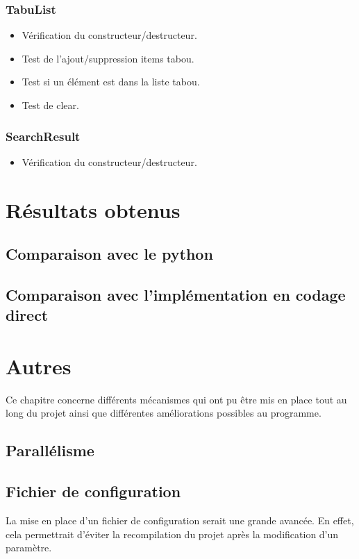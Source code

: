 \documentclass[hideweeklyreports]{polytech/polytech}
\begin{document}
			\subsection{TabuList}
				\begin{itemize}
					\item Vérification du constructeur/destructeur.
					\item Test de l'ajout/suppression items tabou.
					\item Test si un élément est dans la liste tabou.
					\item Test de clear.
				\end{itemize}
				
			\subsection{SearchResult}
				\begin{itemize}
					\item Vérification du constructeur/destructeur.
				\end{itemize}
		
	\chapter{Résultats obtenus}
		\section{Comparaison avec le python} %
		\section{Comparaison avec l'implémentation en codage direct} %
	
	\chapter{Autres}
		Ce chapitre concerne différents mécanismes qui ont pu être mis en place tout au long du projet ainsi que différentes améliorations possibles au programme.
		
		\section{Parallélisme} %
		
		\section{Fichier de configuration}
			La mise en place d'un fichier de configuration serait une grande avancée. En effet, cela permettrait d'éviter la recompilation du projet après la modification d'un paramètre.
			
\end{document}
